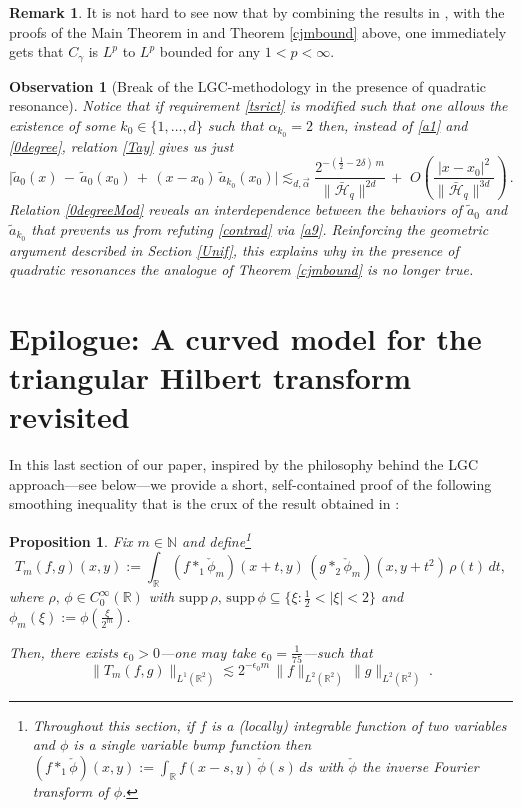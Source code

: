 \documentclass[a4paper,reqno]{amsart}
\numberwithin{equation}{section}
\newtheorem{observation}[theorem]{Observation}
\newtheorem{proposition}[theorem]{Proposition}
\theoremstyle{definition}
\newtheorem{remark}[theorem]{Remark}
\newcommand{\R}{\mathbb{R}}
\newcommand{\N}{\mathbb{N}}
\def\beq{\begin{equation}}
\def\eeq{\end{equation}}
\def\beq{\begin{equation}}
\def\eeq{\end{equation}}
\def\a{\alpha}
\def\g{\gamma}
\def\beq{\begin{equation}}
\def\eeq{\end{equation}}
\def\beq{\begin{equation}}
\def\eeq{\end{equation}}
\def\d{\delta}
\def\ep{\epsilon}
\begin{document}
\begin{remark}
It is not hard to see now that by combining the results in \cite{Car66}, \cite{hu67} with the proofs of the Main Theorem in \cite{Lie19} and Theorem \ref{cjmbound} above, one immediately gets that $C_{\g}$ is $L^p$ to $L^p$ bounded for any $1<p<\infty$.
\end{remark}



\begin{observation}[\textsf{Break of the LGC-methodology in the presence of quadratic resonance}]\label{quadratict} Notice that if requirement \eqref{tsrict} is modified such that one allows the existence of some $k_0\in\{1,\ldots, d\}$ such that $\a_{k_0}=2$ then, instead of \eqref{a1} and \eqref{0degree}, relation \eqref{Tay} gives us just
\beq\label{0degreeMod}
\Big|\tilde{a}_0(x)\,-\,\tilde{a}_0(x_0)\,+\,(x-x_0)\,\tilde{a}_{k_0}(x_0)\Big|\lesssim_{d,\vec{\a}} \frac{2^{-(\frac{1}{2}-2\d)\,m}}{\|\bar{\mathcal{H}}_q\|^{2d}}\,+\,
  \,O\left(\frac{|x-x_0|^2}{\|\bar{\mathcal{H}}_q\|^{3d}}\right)\,.
\eeq
Relation \eqref{0degreeMod} reveals an interdependence between the behaviors of $\tilde{a}_0$ and $\tilde{a}_{k_0}$ that prevents us from refuting \eqref{contrad} via \eqref{a9}. Reinforcing the geometric argument described in Section \ref{Unif}, this explains why in the presence of quadratic resonances the analogue of Theorem \ref{cjmbound} is no longer true.
\end{observation}

\section{Epilogue: A curved model for the triangular Hilbert transform revisited}\label{TrHC}


In this last section of our paper, inspired by the philosophy behind the LGC approach---see below---we provide a short, self-contained proof of the following smoothing inequality that is the crux of the result obtained in \cite{CDR20}:
\smallskip

\begin{proposition}\label{MSTrHC}
	Fix $m\in\N$ and define\footnote{Throughout this section, if $f$ is a (locally) integrable function of two variables and $\phi$ is a single variable bump function then $(f*_{1}\check{\phi})(x,y):=\int_\R f(x-s,y)\,\check{\phi}(s)\,ds$ with $\check{\phi}$ the inverse Fourier transform of $\phi$.}
	\begin{equation}\label{defTm}
		T_m(f,g)(x,y):=\int_{\R} (f*_{1}\check{\phi}_m)(x+t,y)\,(g*_2\check{\phi}_m)(x,y+t^2)\,\rho(t)\,dt,
	\end{equation}
	where  $\rho,\,\phi\in C_0^{\infty}(\R)$ with $\textrm{supp}\,\rho,\,\textrm{supp}\,\phi\subseteq\{\xi:\frac{1}{2}<|\xi|<2\}$ and $\phi_m(\xi):=\phi(\frac{\xi}{2^m})$.

Then, there exists  $\ep_0>0$---one may take $\ep_0=\frac{1}{75}$---such that
	\begin{equation}\label{decmtr}
		\|T_m(f,g)\|_{L^1(\R^2)}\lesssim 2^{-\ep_0 m}\,\|f\|_{L^2(\R^2)}\,\|g\|_{L^2(\R^2)}\;.
	\end{equation}
\end{proposition}
\smallskip
\end{document}

